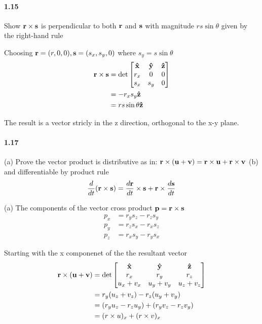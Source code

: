 \documentclass[../problems.tex]{subfiles}
\begin{document}
\paragraph{1.15}
Show $\mathbf{r} \times \mathbf{s}$ is perpendicular to both $\mathbf{r}$ and $\mathbf{s}$ with magnitude 
$rs \sin{\theta}$ given by the right-hand rule
\barh

Choosing $\mathbf{r} = (r, 0, 0) , \mathbf{s} = (s_x, s_y, 0)$ where $s_y = s \sin{\theta}$
\begin{align*}
    \mathbf{r} \times \mathbf{s} &= \det \begin{bmatrix}
        \mathbf{\hat x} & \mathbf{\hat y} & \mathbf{\hat z} \\
        r_x & 0 & 0 \\
        s_x & s_y & 0
    \end{bmatrix} \\
    &= -r_x s_y \mathbf{\hat z} \\
    &= rs \sin{\theta} \mathbf{\hat z}
\end{align*}

    The result is a vector stricly in the z direction, orthogonal to the x-y plane. 

\paragraph{1.17}
(a) Prove the vector product is distributive as in: $\mathbf{r} \times (\mathbf{u} + \mathbf{v}) 
= \mathbf{r} \times \mathbf{u} + \mathbf{r} \times \mathbf{v}$ (b) and differentiable by product rule
\begin{equation*}
    \frac{d}{dt} (\mathbf{r} \times \mathbf{s}) = \frac{d\mathbf{r}}{dt} \times \mathbf{s} + \mathbf{r} 
    \times \frac{d\mathbf{s}}{dt}
\end{equation*}
\barh

(a) The components of the vector cross product $\mathbf{p} = \mathbf{r} \times \mathbf{s}$
\begin{equation} \tag{1.9} \label{eq1.9}
\begin{split}
    p_x &= r_y s_z - r_z s_y \\
    p_y &= r_z s_x - r_x s_z \\
    p_z &= r_x s_y - r_y s_x
\end{split}
\end{equation}

Starting with the x componenet of the the resultant vector
\begin{align*}
    \mathbf{r} \times (\mathbf{u} + \mathbf{v}) &= \det \begin{bmatrix}
        \mathbf{\hat x} & \mathbf{\hat y} & \mathbf{\hat z} \\
        r_x & r_y & r_z \\
        u_x + v_x & u_y + v_y & u_z + v_z
    \end{bmatrix} \\
    &= r_y(u_z + v_z) - r_z(u_y + v_y) \\
    &= (r_y u_z - r_z u_y) + (r_y v_z - r_z v_y) \\
    &= (r \times u)_x + (r \times v)_x 
\end{align*}
\end{document}
